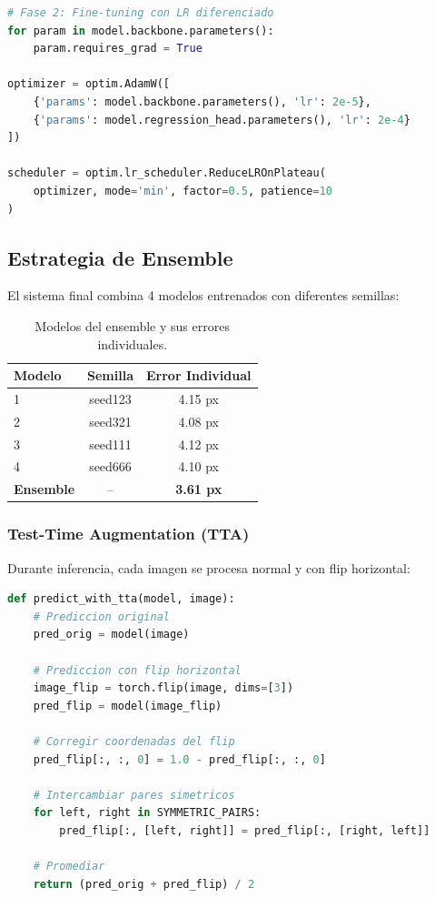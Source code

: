 \documentclass[12pt,a4paper]{article}
\begin{document}
\begin{lstlisting}[language=Python]
# Fase 2: Fine-tuning con LR diferenciado
for param in model.backbone.parameters():
    param.requires_grad = True

optimizer = optim.AdamW([
    {'params': model.backbone.parameters(), 'lr': 2e-5},
    {'params': model.regression_head.parameters(), 'lr': 2e-4}
])

scheduler = optim.lr_scheduler.ReduceLROnPlateau(
    optimizer, mode='min', factor=0.5, patience=10
)
\end{lstlisting}

\subsection{Estrategia de Ensemble}

El sistema final combina 4 modelos entrenados con diferentes semillas:

\begin{table}[H]
\centering
\begin{tabular}{lcc}
\toprule
\textbf{Modelo} & \textbf{Semilla} & \textbf{Error Individual} \\
\midrule
1 & seed123 & 4.15 px \\
2 & seed321 & 4.08 px \\
3 & seed111 & 4.12 px \\
4 & seed666 & 4.10 px \\
\midrule
\textbf{Ensemble} & -- & \textbf{3.61 px} \\
\bottomrule
\end{tabular}
\caption{Modelos del ensemble y sus errores individuales.}
\end{table}

\subsubsection{Test-Time Augmentation (TTA)}

Durante inferencia, cada imagen se procesa normal y con flip horizontal:

\begin{lstlisting}[language=Python]
def predict_with_tta(model, image):
    # Prediccion original
    pred_orig = model(image)

    # Prediccion con flip horizontal
    image_flip = torch.flip(image, dims=[3])
    pred_flip = model(image_flip)

    # Corregir coordenadas del flip
    pred_flip[:, :, 0] = 1.0 - pred_flip[:, :, 0]

    # Intercambiar pares simetricos
    for left, right in SYMMETRIC_PAIRS:
        pred_flip[:, [left, right]] = pred_flip[:, [right, left]]

    # Promediar
    return (pred_orig + pred_flip) / 2
\end{lstlisting}
\end{document}
